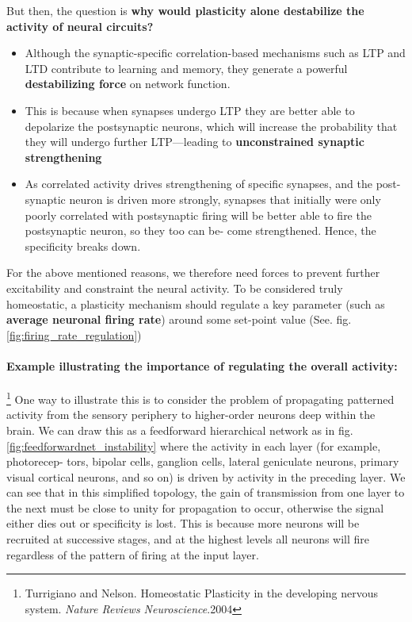 \documentclass[main]{subfiles}
\begin{document}
\noindent But then, the question is \textbf{why would plasticity alone destabilize the activity of neural circuits?}
\begin{itemize}
    \item Although the synaptic-specific correlation-based mechanisms such as LTP and LTD contribute to learning and memory, they generate a powerful \textbf{destabilizing force} on network function. 
    \item This is because when synapses undergo LTP they are better able to depolarize the postsynaptic neurons, which will increase the probability that they will undergo further LTP—leading to \textbf{unconstrained synaptic strengthening}
    \item As correlated activity drives strengthening of specific synapses, and the post-synaptic neuron is driven more strongly, synapses that initially were only poorly correlated with postsynaptic firing will be better able to fire the postsynaptic neuron, so they too can be- come strengthened. Hence, the specificity breaks down.
\end{itemize}
For the above mentioned reasons, we therefore need forces to prevent further excitability and constraint the neural activity. To be considered truly homeostatic, a plasticity mechanism should regulate a key parameter (such as \textbf{average neuronal firing rate}) around some set-point value (See. fig.\ref{fig:firing_rate_regulation})

\paragraph{Example illustrating the importance of regulating the overall activity:}\footnote{Turrigiano and Nelson. Homeostatic Plasticity in the developing nervous system. \textit{Nature Reviews Neuroscience}.2004} One way to illustrate this is to consider the problem of propagating patterned activity from the sensory periphery to higher-order neurons deep within the brain. We can draw this as a feedforward hierarchical network as in fig. \cref{fig:feedforwardnet_instability} where the activity in each layer (for example, photorecep- tors, bipolar cells, ganglion cells, lateral geniculate neurons, primary visual cortical neurons, and so on) is driven by activity in the preceding layer. We can see that in this simplified topology, the gain of transmission from one layer to the next must be close to unity for propagation to occur, otherwise the signal either dies out or specificity is lost. This is because more neurons will be recruited at successive stages, and at the highest levels all neurons will fire regardless of the pattern of firing at the input layer.\\
\end{document}
